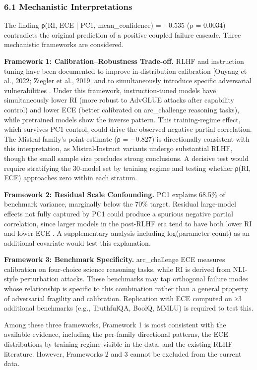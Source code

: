 
\subsubsection{6.1 Mechanistic Interpretations}

The finding ρ(RI, ECE | PC1, mean_confidence) = −0.535 (p = 0.0034) contradicts the original prediction of a positive coupled failure cascade. Three mechanistic frameworks are considered.

\textbf{Framework 1: Calibration–Robustness Trade-off.} RLHF and instruction tuning have been documented to improve in-distribution calibration [Ouyang et al., 2022; Ziegler et al., 2019] and to simultaneously introduce specific adversarial vulnerabilities \citep{Perezetal2022}. Under this framework, instruction-tuned models have simultaneously lower RI (more robust to AdvGLUE attacks after capability control) and lower ECE (better calibrated on arc_challenge reasoning tasks), while pretrained models show the inverse pattern. This training-regime effect, which survives PC1 control, could drive the observed negative partial correlation. The Mistral family's point estimate (ρ = −0.827) is directionally consistent with this interpretation, as Mistral-Instruct variants undergo substantial RLHF, though the small sample size precludes strong conclusions. A decisive test would require stratifying the 30-model set by training regime and testing whether ρ(RI, ECE) approaches zero within each stratum.

\textbf{Framework 2: Residual Scale Confounding.} PC1 explains 68.5\% of benchmark variance, marginally below the 70\% target. Residual large-model effects not fully captured by PC1 could produce a spurious negative partial correlation, since larger models in the post-RLHF era tend to have both lower RI and lower ECE \citep{Mindereretal2021}. A supplementary analysis including log(parameter count) as an additional covariate would test this explanation.

\textbf{Framework 3: Benchmark Specificity.} arc_challenge ECE measures calibration on four-choice science reasoning tasks, while RI is derived from NLI-style perturbation attacks. These benchmarks may tap orthogonal failure modes whose relationship is specific to this combination rather than a general property of adversarial fragility and calibration. Replication with ECE computed on ≥3 additional benchmarks (e.g., TruthfulQA, BoolQ, MMLU) is required to test this.

Among these three frameworks, Framework 1 is most consistent with the available evidence, including the per-family directional patterns, the ECE distributions by training regime visible in the data, and the existing RLHF literature. However, Frameworks 2 and 3 cannot be excluded from the current data.

